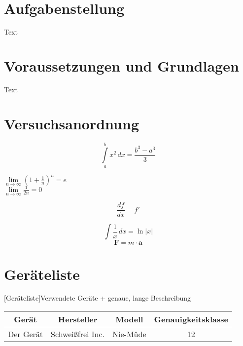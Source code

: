 \documentclass[11pt]{scrartcl}
\begin{document}


\tableofcontents
\newpage

\section{Aufgabenstellung}
\label{sec:aufgabenstellung}

Text


\section{Voraussetzungen und Grundlagen}
\label{sec:voraussetzungen-rundlagen}

Text


\section{Versuchsanordnung}
\label{sec:versuchsanordnung}

\begin{equation}
\label{eq:grenzen-oben-unten}
    \int \limits_{a}^{b} x^2 \, dx =\frac{b^3-a^3}{3}  %
\end{equation}

\( \lim \limits_{n \to \infty} \left( 1 + \frac{1}{n} \right) ^{n} = e\)  \\ %
$\lim \limits_{n \to \infty} \frac{1}{2n} = 0$  %

\begin{displaymath}
    \frac{df}{dx} = f'
\end{displaymath}

\[ \int \frac{1}{x} \, dx = \ln|x| \]  %
$$ \textbf{F} = m \cdot \textbf{a} $$  %



\section{Geräteliste}
\label{sec:geraeteliste}

\begin{center}
[Geräteliste]{Verwendete Geräte + genaue, lange Beschreibung}  %
\label{tab:geraeteliste}
    \begin{tabular}{|c|c|c|c|} \hline
        Gerät & Hersteller & Modell & Genauigkeitsklasse \\ \hline
        Der Gerät & Schweißfrei Inc. & Nie-Müde & 12 \\ \hline
    \end{tabular}
\end{center}
\end{document}
